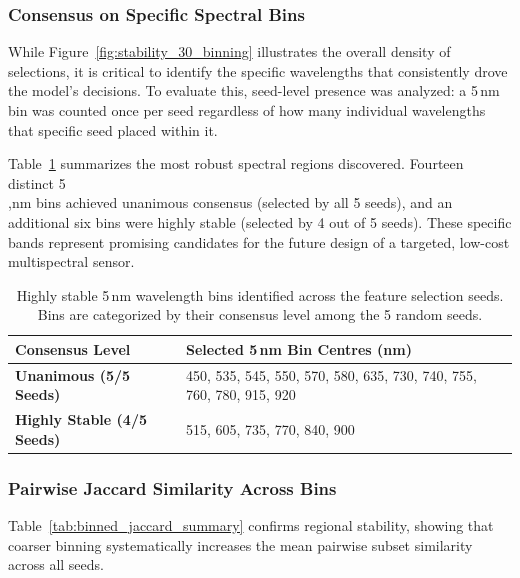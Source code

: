 
\subsubsection{Consensus on Specific Spectral Bins}
\noindent
While Figure~\ref{fig:stability_30_binning} illustrates the overall density of selections, it is critical to identify the specific wavelengths that consistently drove the model's decisions. To evaluate this, seed-level presence was analyzed: a 5\,nm bin was counted once per seed regardless of how many individual wavelengths that specific seed placed within it. 

\noindent
Table~\ref{tab:stable_bins} summarizes the most robust spectral regions discovered. Fourteen distinct 5\\,nm bins achieved unanimous consensus (selected by all 5 seeds), and an additional six bins were highly stable (selected by 4 out of 5 seeds). These specific bands represent promising candidates for the future design of a targeted, low-cost multispectral sensor.

\begin{table}[!htbp]
    \centering
    \caption[Consensus of 5\,nm wavelength bins across BFS seeds]{Highly stable 5\,nm wavelength bins identified across the feature selection seeds. Bins are categorized by their consensus level among the 5 random seeds.}
    \label{tab:stable_bins}
    \begin{tabular}{@{}lp{10cm}@{}}
        \toprule
        \textbf{Consensus Level} & \textbf{Selected 5\,nm Bin Centres (nm)} \\
        \midrule
        \textbf{Unanimous (5/5 Seeds)} & 450, 535, 545, 550, 570, 580, 635, 730, 740, 755, 760, 780, 915, 920 \\
        \addlinespace
        \textbf{Highly Stable (4/5 Seeds)} & 515, 605, 735, 770, 840, 900 \\
        \bottomrule
    \end{tabular}
\end{table}


\subsubsection{Pairwise Jaccard Similarity Across Bins}
\noindent
Table~\ref{tab:binned_jaccard_summary} confirms regional stability, showing that coarser binning systematically increases the mean pairwise subset similarity across all seeds.




